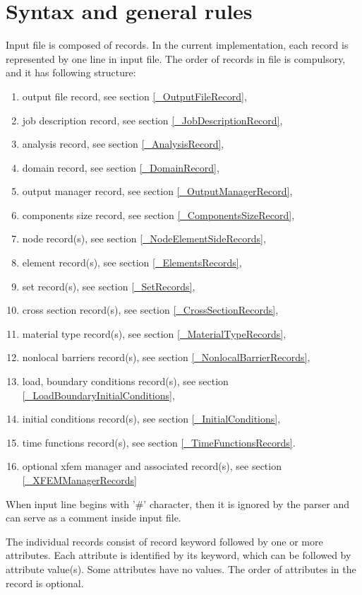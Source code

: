 \documentclass[a4paper]{article}
\begin{document}
\section{Syntax and general rules}

Input file is composed of records. In the current implementation, each record is represented by one line in input file.
The order of records in file is compulsory, and it has following structure:
\begin{enumerate}
\item output file record, see section \ref{_OutputFileRecord},
\item job description record, see section \ref{_JobDescriptionRecord},
\item analysis record, see section \ref{_AnalysisRecord},
\item domain record, see section \ref{_DomainRecord},
\item output manager record, see section \ref{_OutputManagerRecord},
\item components size record, see section \ref{_ComponentsSizeRecord},
\item node record(s), see section \ref{_NodeElementSideRecords},
\item element record(s), see section \ref{_ElementsRecords},
\item set record(s), see section \ref{_SetRecords},
\item cross section record(s), see section \ref{_CrossSectionRecords},
\item material type  record(s), see section \ref{_MaterialTypeRecords},
\item nonlocal barriers record(s), see section \ref{_NonlocalBarrierRecords},
\item load, boundary  conditions record(s), see section
  \ref{_LoadBoundaryInitialConditions},
\item initial conditions record(s), see section \ref{_InitialConditions},
\item time functions record(s), see section \ref{_TimeFunctionsRecords}.
\item optional xfem manager and associated record(s), see section \ref{_XFEMManagerRecords}
\end{enumerate}
When input line begins with '\#' character, then it is ignored  by the parser and
can serve as a comment inside input file.

The individual records consist of record keyword followed by one or more attributes. Each attribute is identified by
its keyword, which can be followed by attribute value(s). Some attributes have no values.
The order of attributes in the record is optional.
\end{document}
